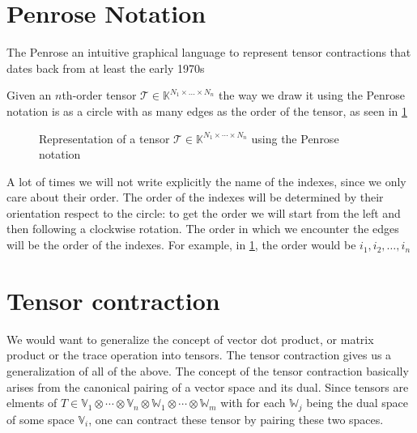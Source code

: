 \documentclass[11pt,a4paper,openright,oneside]{book}
\numberwithin{equation}{section}
\newcommand{\figref}[1]{\cref{#1}}
\begin{document}
\section{Penrose Notation}

The Penrose an intuitive graphical language to represent tensor contractions that
dates back from at least the early 1970s \cite{rogerPenroseApplications}

Given an $n$th-order tensor $\mathcal{T} \in \mathbb{K}^{N_1 \times \dots \times N_n}$ the way we draw it using the
Penrose notation is as a circle with as many edges as the order of the tensor, as seen in \figref{fig:tens}

\begin{figure}[h]
\centering
{}
\caption{
    Representation of a tensor $\mathcal{T} \in \mathbb{K}^{N_1 \times \cdots \times N_n}$ using the Penrose notation
}
\label{fig:tens}
\end{figure}

A lot of times we will not write explicitly the name of the indexes, since we only care about their order. The order
of the indexes will be determined by their orientation respect to the circle: to get the order we will start from the left and then
following a clockwise rotation. The order in which we encounter the edges will be the order of the indexes. For example,
in \figref{fig:tens}, the order would be $i_1, i_2, \dots, i_n$


\section{Tensor contraction}

We would want to generalize the concept of vector dot product, or matrix product or the trace operation into tensors.
The tensor contraction gives us a generalization of all of the above. The concept of the tensor contraction 
basically arises from the canonical pairing of a vector space and its dual. Since tensors are elments
of $T \in \mathbb{V}_1 \otimes \cdots \otimes \mathbb{V}_n \otimes \mathbb{W}_1 \otimes \cdots \otimes \mathbb{W}_m$ with for each
$\mathbb{W}_j$ being the dual space of some space $\mathbb{V}_i$, one can contract these tensor by pairing these two
spaces.
\end{document}
